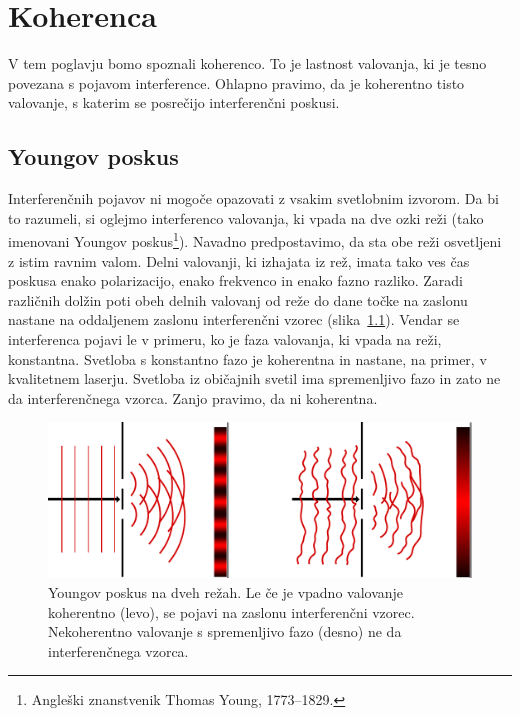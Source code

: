
\chapter{Koherenca}

V tem poglavju bomo spoznali koherenco. To je lastnost
valovanja, ki je tesno povezana s pojavom interference. Ohlapno pravimo,
da je koherentno tisto valovanje, s katerim se posrečijo interferenčni
poskusi.  

\section{Youngov poskus}

Interferenčnih pojavov ni mogoče opazovati z
vsakim svetlobnim izvorom. Da bi to razumeli, si oglejmo interferenco
valovanja, ki vpada na dve ozki reži (tako imenovani Youngov 
poskus\footnote{Angleški znanstvenik Thomas Young, 1773--1829.}). 
Navadno predpostavimo, da
sta obe reži osvetljeni z istim ravnim valom. Delni valovanji, ki
izhajata iz rež, imata tako ves čas poskusa enako polarizacijo, enako
frekvenco in enako fazno razliko. Zaradi različnih dolžin poti obeh
delnih valovanj od reže do dane točke na zaslonu nastane na oddaljenem
zaslonu interferenčni vzorec (slika~\ref{fig:Young}). Vendar se  
interferenca pojavi le v primeru,
ko je faza valovanja, ki vpada na reži, konstantna. Svetloba s konstantno
fazo je koherentna in nastane, na primer, v kvalitetnem laserju.
Svetloba iz običajnih svetil ima spremenljivo fazo in zato ne da interferenčnega vzorca. Zanjo
pravimo, da ni koherentna. 
\begin{figure}[h]
\centering
\includegraphics[width=10truecm]{slike/02_Young.pdf}
\caption{Youngov poskus na dveh režah. Le če je vpadno valovanje koherentno (levo), 
se pojavi na zaslonu interferenčni vzorec. Nekoherentno valovanje s spremenljivo
fazo (desno) ne da interferenčnega vzorca.}
\label{fig:Young}
\end{figure}

